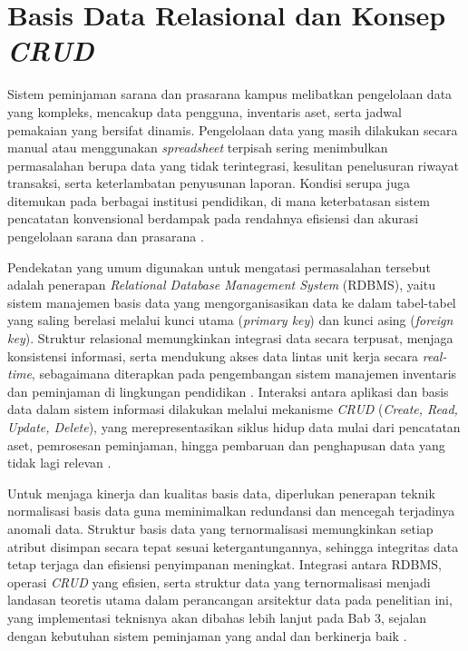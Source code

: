 \section{Basis Data Relasional dan Konsep \textit{CRUD}}
Sistem peminjaman sarana dan prasarana kampus melibatkan pengelolaan data yang kompleks, mencakup data pengguna, inventaris aset, serta jadwal pemakaian yang bersifat dinamis. Pengelolaan data yang masih dilakukan secara manual atau menggunakan \textit{spreadsheet} terpisah sering menimbulkan permasalahan berupa data yang tidak terintegrasi, kesulitan penelusuran riwayat transaksi, serta keterlambatan penyusunan laporan. Kondisi serupa juga ditemukan pada berbagai institusi pendidikan, di mana keterbatasan sistem pencatatan konvensional berdampak pada rendahnya efisiensi dan akurasi pengelolaan sarana dan prasarana \parencite{PutriNabella2025}.

Pendekatan yang umum digunakan untuk mengatasi permasalahan tersebut adalah penerapan \textit{Relational Database Management System} (RDBMS), yaitu sistem manajemen basis data yang mengorganisasikan data ke dalam tabel-tabel yang saling berelasi melalui kunci utama (\textit{primary key}) dan kunci asing (\textit{foreign key}). Struktur relasional memungkinkan integrasi data secara terpusat, menjaga konsistensi informasi, serta mendukung akses data lintas unit kerja secara \textit{real-time}, sebagaimana diterapkan pada pengembangan sistem manajemen inventaris dan peminjaman di lingkungan pendidikan \parencite{Velasquez-Jimenez2025, Ramdany2024}. Interaksi antara aplikasi dan basis data dalam sistem informasi dilakukan melalui mekanisme \textit{CRUD} (\textit{Create, Read, Update, Delete}), yang merepresentasikan siklus hidup data mulai dari pencatatan aset, pemrosesan peminjaman, hingga pembaruan dan penghapusan data yang tidak lagi relevan \parencite{Purwati2022}.

Untuk menjaga kinerja dan kualitas basis data, diperlukan penerapan teknik normalisasi basis data guna meminimalkan redundansi dan mencegah terjadinya anomali data. Struktur basis data yang ternormalisasi memungkinkan setiap atribut disimpan secara tepat sesuai ketergantungannya, sehingga integritas data tetap terjaga dan efisiensi penyimpanan meningkat. Integrasi antara RDBMS, operasi \textit{CRUD} yang efisien, serta struktur data yang ternormalisasi menjadi landasan teoretis utama dalam perancangan arsitektur data pada penelitian ini, yang implementasi teknisnya akan dibahas lebih lanjut pada Bab 3, sejalan dengan kebutuhan sistem peminjaman yang andal dan berkinerja baik \parencite{Pratama2025}.


